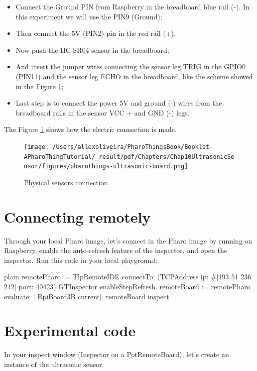 \documentclass[10pt,twoside,english]{_support/latex/sbabook/sbabook}
\begin{document}
\begin{itemize}
\item Connect the Ground PIN from Raspberry in the breadboard blue rail (-). In this experiment we will use the PIN9 (Ground);
\item Then connect the 5V (PIN2) pin in the red rail (+). 
\item Now push the HC-SR04 sensor in the breadboard;
\item And insert the jumper wires connecting the sensor leg TRIG in the GPIO0 (PIN11) and the sensor leg ECHO in the breadboard, like the scheme showed in the Figure \ref{physicalSonicSensors};
\item Last step is to connect the power 5V and ground (-) wires from the breadboard rails in the sensor VCC + and GND (-) legs.
\end{itemize}

The Figure \ref{physicalSonicSensors} shows how the electric connection is made.


\begin{figure}

\begin{center}
\texttt{[image: /Users/allexoliveira/PharoThingsBook/Booklet-APharoThingTutorial/\_result/pdf/Chapters/Chap10UltrasonicSensor/figures/pharothings-ultrasonic-board.png]}\caption{Physical sensors connection.\label{physicalSonicSensors}}\end{center}
\end{figure}

\section{Connecting remotely}
Through your local Pharo image, let’s connect in the Pharo image by running on Raspberry, enable the auto-refresh feature of the inspector, and open the inspector.
Run this code in your local playground:

\begin{displaycode}{plain}
remotePharo := TlpRemoteIDE connectTo: (TCPAddress ip: #[193 51 236 212] port: 40423)
GTInspector enableStepRefresh.
remoteBoard := remotePharo evaluate: [ RpiBoard3B current].
remoteBoard inspect.
\end{displaycode}
\section{Experimental code}
In your inspect window (Inspector on a PotRemoteBoard), let’s create an instance of the ultrasonic sensor. 
\end{document}
